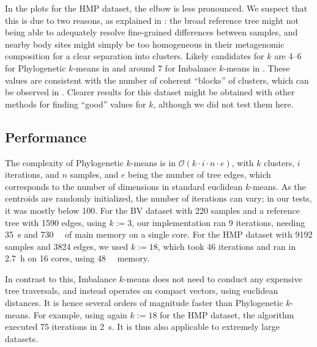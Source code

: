 In the plots for the \ac{HMP} dataset, the elbow is less pronounced.
We suspect that this is due to two reasons, as explained in :
the broad reference tree might not being able to adequately resolve fine-grained differences between samples,
and nearby body sites might simply be too homogeneous in their metagenomic composition for a clear separation into clusters.
Likely candidates for $k$ are \num{4}--\num{6} for Phylogenetic $k$-means in 
and around \num{7} for Imbalance $k$-means in .
These values are consistent with the number of coherent ``blocks'' of clusters,
which can be observed in .
Clearer results for this dataset might be obtained with other methods for finding ``good'' values for $k$,
although we did not test them here.


\subsection{Performance}
\label{ch:Clustering:sec:Results:sub:Performance}

The complexity of Phylogenetic $k$-means is in $\mathcal{O}(k \cdot i \cdot n \cdot e)$,
with $k$ clusters, $i$ iterations, and $n$ samples, and $e$ being the number of tree edges,
which corresponds to the number of dimensions in standard euclidean $k$-means.
As the centroids are randomly initialized, the number of iterations can vary;
in our tests, it was mostly below \num{100}.
For the \ac{BV} dataset with \num{220} samples and a reference tree with \num{1 590} edges, using $k:=3$,
our implementation ran \num{9} iterations, needing \SI{35}{\second} and \SI{730}{\mega\byte} of main memory on a single core.
For the \ac{HMP} dataset with \num{9 192} samples and \num{3 824} edges, we used $k:=18$,
which took \num{46} iterations and ran in \SI{2.7}{\hour} on \num{16} cores, using \SI{48}{\giga\byte} memory.

In contrast to this, Imbalance $k$-means does not need to conduct any expensive tree traversals,
and instead operates on compact vectors, using euclidean distances.
It is hence several orders of magnitude faster than Phylogenetic $k$-means.
For example, using again $k:=18$ for the \ac{HMP} dataset,
the algorithm executed \num{75} iterations in \SI{2}{\second}.
It is thus also applicable to extremely large datasets.


